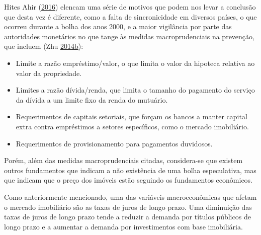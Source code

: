 \documentclass[
	12pt,				%
	oneside,			%
	a4paper,			%
	chapter=TITLE,		%
	section=TITLE,		%
	english,			%
	brazil				%
	]{abntex2}
\begin{document}
Hites Ahir (\protect\hyperlink{ref-fmitwa}{2016}) elencam uma série de motivos que podem nos levar a conclusão que desta
vez é diferente, como a falta de sincronicidade em diversos países, o que
ocorreu durante a bolha dos anos 2000, e a maior vigilância por parte das
autoridades monetários no que tange às medidas macroprudenciais na prevenção,
que incluem (Zhu \protect\hyperlink{ref-fmiem}{2014}\protect\hyperlink{ref-fmiem}{b}):
\begin{itemize}
\tightlist
\item
  Limite a razão empréstimo/valor, o que limita o valor da hipoteca relativa
  ao valor da propriedade.
\item
  Limites a razão dívida/renda, que limita o tamanho do pagamento do serviço da
  dívida a um limite fixo da renda do mutuário.
\item
  Requerimentos de capitais setoriais, que forçam os bancos a manter capital
  extra contra empréstimos a setores específicos, como o mercado imobiliário.
\item
  Requerimentos de provisionamento para pagamentos duvidosos.
\end{itemize}
Porém, além das medidas macroprudenciais citadas, considera-se que existem
outros fundamentos que indicam a não existência de uma bolha especulativa, mas
que indicam que o preço dos imóveis estão seguindo os fundamentos econômicos.

Como anteriormente mencionado, uma das variáveis macroeconômicas que afetam o
mercado imobiliário são as taxas de juros de longo prazo. Uma diminuição das
taxas de juros de longo prazo tende a reduzir a demanda por títulos públicos de
longo prazo e a aumentar a demanda por investimentos com base imobiliária.
\end{document}
